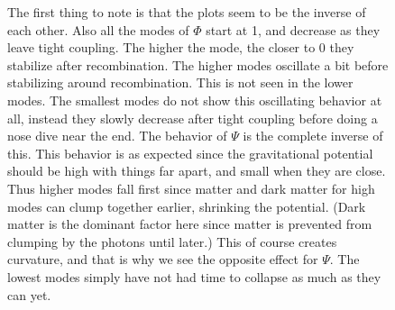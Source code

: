 \documentclass[a4paper]{report}
\begin{document}
\begin{figure}[ht]
\caption{The first thing to note is that the plots seem to be the inverse of each other. Also all the modes of $\Phi$ start at 1, and decrease as they leave tight coupling. The higher the mode, the closer to 0 they stabilize after recombination. The higher modes oscillate a bit before stabilizing around recombination. This is not seen in the lower modes. The smallest modes do not show this oscillating behavior at all, instead they slowly decrease after tight coupling before doing a nose dive near the end. The behavior of $\Psi$ is the complete inverse of this. This behavior is as expected since the gravitational potential should be high with things far apart, and small when they are close. Thus higher modes fall first since matter and dark matter for high modes can clump together earlier, shrinking the potential. (Dark matter is the dominant factor here since matter is prevented from clumping by the photons until later.) This of course creates curvature, and that is why we see the opposite effect for $\Psi$. The lowest modes simply have not had time to collapse as much as they can yet.}
\end{figure}
\end{document}
